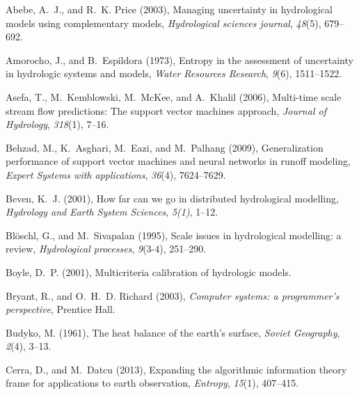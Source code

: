 \documentclass[draft,wrr]{AGUTeX}
\begin{document}
\begin{article}
\begin{thebibliography}{59}
Abebe, A.~J., and R.~K. Price (2003), Managing uncertainty in hydrological
  models using complementary models, \textit{Hydrological sciences journal},
  \textit{48}(5), 679--692.

Amorocho, J., and B.~Espildora (1973), Entropy in the assessment of uncertainty
  in hydrologic systems and models, \textit{Water Resources Research},
  \textit{9}(6), 1511--1522.

Asefa, T., M.~Kemblowski, M.~McKee, and A.~Khalil (2006), Multi-time scale
  stream flow predictions: The support vector machines approach,
  \textit{Journal of Hydrology}, \textit{318}(1), 7--16.

Behzad, M., K.~Asghari, M.~Eazi, and M.~Palhang (2009), Generalization
  performance of support vector machines and neural networks in runoff
  modeling, \textit{Expert Systems with applications}, \textit{36}(4),
  7624--7629.

Beven, K.~J. (2001), How far can we go in distributed hydrological modelling,
  \textit{Hydrology and Earth System Sciences}, \textit{5(1)}, 1--12.

Bl{\"o}schl, G., and M.~Sivapalan (1995), Scale issues in hydrological
  modelling: a review, \textit{Hydrological processes}, \textit{9}(3-4),
  251--290.

Boyle, D.~P. (2001), Multicriteria calibration of hydrologic models.

Bryant, R., and O.~H.~D. Richard (2003), \textit{Computer systems: a
  programmer's perspective}, Prentice Hall.

Budyko, M. (1961), The heat balance of the earth's surface, \textit{Soviet
  Geography}, \textit{2}(4), 3--13.

Cerra, D., and M.~Datcu (2013), Expanding the algorithmic information theory
  frame for applications to earth observation, \textit{Entropy},
  \textit{15}(1), 407--415.


\end{thebibliography}
\end{article}
\end{document}
